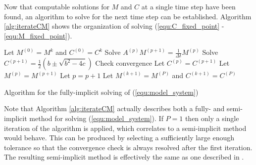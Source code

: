 Now that computable solutions for $M$ and $C$ at a single time step have been found, an algorithm to solve for the next time step can be established.
Algorithm \ref{alg:iterateCM} shows the organization of solving (\ref{equ:C_fixed_point} - \ref{equ:M_fixed_point}). 
\begin{algorithm}
  \Begin
  {
    Let $M^{(0)} = M^{k}$ and $C^{(0)} = C^{k}$\;
    {
        Solve $A^{(p)} M^{(p+1)} = \frac{1}{\Delta t}M^{(p)}$\;
        Solve $C^{(p+1)} = \frac{1}{2} \left( b \pm \sqrt{b^2 - 4c} \right)$\;
        Check convergence\; 
        Let $C^{(p)} = C^{(p+1)}$\;
        Let $M^{(p)} = M^{(p+1)}$\;
        Let $p = p + 1 $\;
    }
    Let $M^{(k+1)} = M^{(P)}$ and $C^{(k+1)} = C^{(P)}$\;
  }
  \caption{Algorithm for the fully-implicit solving of (\ref{equ:model_system}) }
  \label{alg:iterateCM}
\end{algorithm}

Note that Algorithm \ref{alg:iterateCM} actually describes both a fully- and semi- implicit method for solving (\ref{equ:model_system}). 
If $P = 1$ then only a single iteration of the algorithm is applied, which correlates to a semi-implicit method would behave.
This can be produced by selecting a sufficiently large enough tolerance so that the convergence check is always resolved after the first iteration.
The resulting semi-implicit method is effectively the same as one described in \cite{sirca2012computational}.



